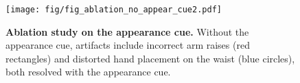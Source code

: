 
\begin{figure}[h]
    \centering
    \texttt{[image: fig/fig\_ablation\_no\_appear\_cue2.pdf]}
    \caption{\textbf{Ablation study on the appearance cue.} Without the appearance cue, artifacts include incorrect arm raises (red rectangles) and distorted hand placement on the waist (blue circles), both resolved with the appearance cue.}
    \label{fig:ablation_wo_appear_cue}
\end{figure}

